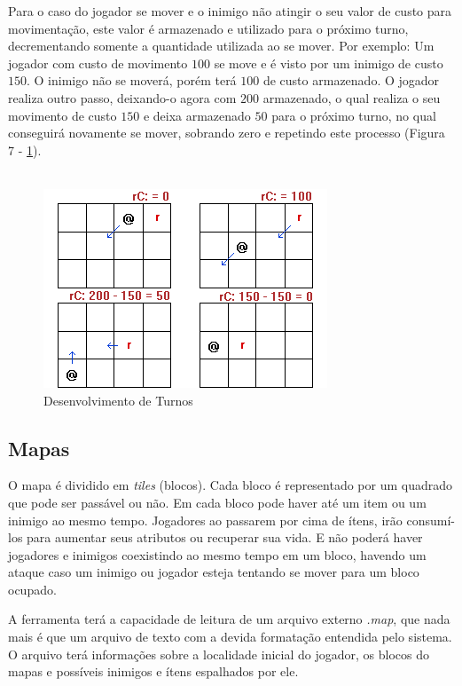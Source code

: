Para o caso do jogador se mover e o inimigo não atingir o seu valor de custo para movimentação, este valor é armazenado e utilizado para o próximo turno, decrementando somente a quantidade utilizada ao se mover. Por exemplo: Um jogador com custo de movimento $100$ se move e é visto por um inimigo de custo $150$. O inimigo não se moverá, porém terá $100$ de custo armazenado. O jogador realiza outro passo, deixando-o agora com $200$ armazenado, o qual realiza o seu movimento de custo $150$ e deixa armazenado $50$ para o próximo turno, no qual conseguirá novamente se mover, sobrando zero e repetindo este processo (Figura 7 - \ref{fig07}).
\\\\
\begin{figure}[h]
	\centering
	\label{fig07}
		\includegraphics[keepaspectratio=true,scale=0.8]{figuras/fig07-turn.png}
	\caption{Desenvolvimento de Turnos}
\end{figure}

\subsection{Mapas}

O mapa é dividido em \textit{tiles} (blocos). Cada bloco é representado por um quadrado que pode ser passável ou não. Em cada bloco pode haver até um item ou um inimigo ao mesmo tempo. Jogadores ao passarem por cima de ítens, irão consumí-los para aumentar seus atributos ou recuperar sua vida. E não poderá haver jogadores e inimigos coexistindo ao mesmo tempo em um bloco, havendo um ataque caso um inimigo ou jogador esteja tentando se mover para um bloco ocupado.

A ferramenta terá a capacidade de leitura de um arquivo externo \textit{.map}, que nada mais é que um arquivo de texto com a devida formatação entendida pelo sistema. O arquivo terá informações sobre a localidade inicial do jogador, os blocos do mapas e possíveis inimigos e ítens espalhados por ele.

